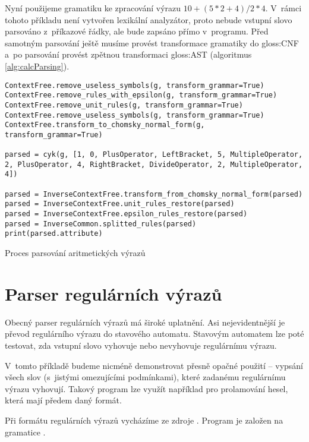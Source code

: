		Nyní použijeme gramatiku ke zpracování výrazu $10 + ( 5 * 2 + 4 ) / 2 * 4$. V~rámci tohoto příkladu není vytvořen lexikální analyzátor, proto nebude vstupní slovo parsováno z~příkazové řádky, ale bude zapsáno přímo v~programu. Před samotným parsování ještě musíme provést transformace gramatiky do \gls{gloss:CNF} a~po parsování provést zpětnou transformaci \gls{gloss:AST} (algoritmus \ref{alg:calcParsing}).
		
		\begin{listing}
			\begin{verbatim}
ContextFree.remove_useless_symbols(g, transform_grammar=True)
ContextFree.remove_rules_with_epsilon(g, transform_grammar=True)
ContextFree.remove_unit_rules(g, transform_grammar=True)
ContextFree.remove_useless_symbols(g, transform_grammar=True)
ContextFree.transform_to_chomsky_normal_form(g, transform_grammar=True)

parsed = cyk(g, [1, 0, PlusOperator, LeftBracket, 5, MultipleOperator, 2, PlusOperator, 4, RightBracket, DivideOperator, 2, MultipleOperator, 4])

parsed = InverseContextFree.transform_from_chomsky_normal_form(parsed)
parsed = InverseContextFree.unit_rules_restore(parsed)
parsed = InverseContextFree.epsilon_rules_restore(parsed)
parsed = InverseCommon.splitted_rules(parsed)
print(parsed.attribute)
			\end{verbatim}
			\caption{Proces parsování aritmetických výrazů}
			\label{alg:calcParsing}
		\end{listing}
	

	\section{Parser regulárních výrazů}
		
		Obecný parser regulárních výrazů má široké uplatnění. Asi nejevidentnější je převod regulárního výrazu do stavového automatu. Stavovým automatem lze poté testovat, zda vstupní slovo vyhovuje nebo nevyhovuje regulárnímu výrazu.
		
		V~tomto příkladě budeme nicméně demonstrovat přesně opačné použití -- vypsání všech slov (s~jistými omezujícími podmínkami), které zadanému regulárnímu výrazu vyhovují. Takový program lze využít například pro prolamování hesel, která mají předem daný formát.
		
		Při formátu regulárních výrazů vycházíme ze zdroje \cite{Aho:1986:CPT:6448}. Program je založen na gramatice \GrammarDef.
		
